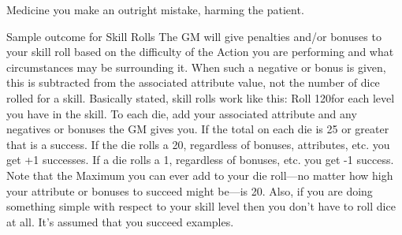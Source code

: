 \documentclass[twoside]{book}
\begin{document}
                  
                   Medicine   
                     you make an outright mistake, harming the
                     patient. 
                  
                
              Sample outcome for Skill Rolls  
             The GM will give penalties and/or bonuses to your
               skill roll based on the difficulty of the Action you are
               performing and what circumstances may be surrounding it.
               When such a negative or bonus is given, this is subtracted
               from the associated attribute value, not the number of
               dice rolled for a skill.  Basically stated, skill rolls work like this: Roll
               120for each level you have in the skill. To each die,
               add your associated attribute and any negatives or bonuses
               the GM gives you. If the total on each die is 25 or
               greater that is a success. If the die rolls a 20,
               regardless of bonuses, attributes, etc. you get +1
               successes. If a die rolls a 1, regardless of bonuses, etc.
               you get -1 success.  Note that the Maximum you can ever add to your die
               roll—no matter how high your attribute or bonuses to
               succeed might be—is 20.  Also, if you are doing something simple with respect
               to your skill level then you don’t have to roll dice
               at all. It’s assumed that you succeed examples.
               
  
  
\end{document}
